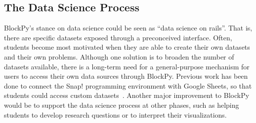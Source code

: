 \documentclass[10pt,journal,compsoc]{IEEEtran}
\begin{document}


\subsection{The Data Science Process}

BlockPy's stance on data science could be seen as ``data science on rails''.
That is, there are specific datasets exposed through a preconceived interface.
Often, students become most motivated when they are able to create their own datasets and their own problems.
Although one solution is to broaden the number of datasets available, there is a long-term need for a general-purpose mechanism for users to access their own data sources through BlockPy.
Previous work has been done to connect the Snap! programming environment with Google Sheets, so that students could access custom datasets~\cite{hellmann2015datasnap}.
Another major improvement to BlockPy would be to support the data science process at other phases, such as helping students to develop research questions or to interpret their visualizations.
\end{document}
